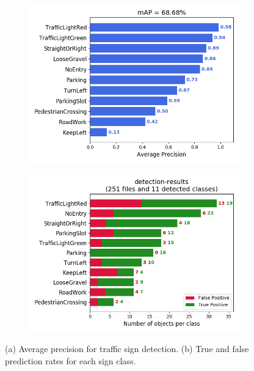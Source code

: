 \begin{figure}[h]
  \centering
  \begin{subfigure}[b]{0.47\linewidth}
    \includegraphics[width=\linewidth]{figures/experiments/mAP.png}
    \caption{}
  \end{subfigure}
  \begin{subfigure}[b]{0.47\linewidth}
    \includegraphics[width=\linewidth]{figures/experiments/detection-results-info.png}
    \caption{}
  \end{subfigure}
  \caption[Evaluation of traffic sign detection and recognition]{(a) Average
    precision for traffic sign detection. (b) True and false prediction rates
    for each sign class.}
  \label{figure:average-precision}
\end{figure}



